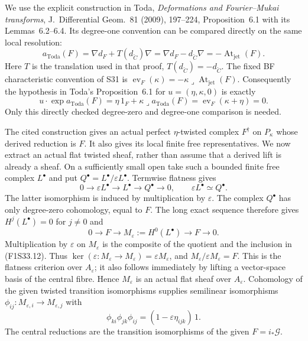 We use the explicit construction in Toda,
\emph{Deformations and Fourier--Mukai transforms},
J.~Differential Geom.~81 (2009), 197--224,
Proposition~6.1 with its Lemmas~6.2--6.4.
Its degree-one convention can be compared directly
on the same local resolution:
\[
 a_{\mathrm{Toda}}(F)=
       \nabla d_F+T(d_{\check C})\nabla
       =\nabla d_F-d_{\check C}\nabla
       =-\operatorname{At}_{\mathrm{jet}}(F).
 \tag{F1S33.9}
\]
Here $T$ is the translation used in that proof,
$T(d_{\check C})=-d_{\check C}$.
The fixed BF characteristic convention of S31 is
$\operatorname{ev}_F(\kappa)
 =-\kappa\mathbin{\lrcorner}\operatorname{At}_{\mathrm{jet}}(F)$.
Consequently the hypothesis in Toda's Proposition~6.1
for $u=(\eta,\kappa,0)$ is exactly
\[
 u\cdot\exp a_{\mathrm{Toda}}(F)
     =\eta\,1_F+\kappa\mathbin{\lrcorner}a_{\mathrm{Toda}}(F)
     =\operatorname{ev}_F(\kappa+\eta)=0.
 \tag{F1S33.10}
\]
Only this directly checked degree-zero and degree-one
comparison is needed.

The cited construction gives an actual perfect
$\eta$-twisted complex $F^\dagger$ on $P_\kappa$
whose derived reduction is $F$.
It also gives its local finite free representatives.
We now extract an actual flat twisted sheaf,
rather than assume that a derived lift is already
a sheaf.
On a sufficiently small open take such a bounded
finite free complex $L^\bullet$ and put
$Q^\bullet=L^\bullet/\varepsilon L^\bullet$.
Termwise flatness gives
\[
 0\longrightarrow\varepsilon L^\bullet
    \longrightarrow L^\bullet\longrightarrow Q^\bullet
    \longrightarrow0,\qquad
 \varepsilon L^\bullet\simeq Q^\bullet.
 \tag{F1S33.11}
\]
The latter isomorphism is induced by multiplication
by $\varepsilon$. The complex $Q^\bullet$ has only
degree-zero cohomology, equal to $F$.
The long exact sequence therefore gives
$H^j(L^\bullet)=0$ for $j\ne0$ and
\[
 0\longrightarrow F
   \longrightarrow M_\varepsilon:=H^0(L^\bullet)
   \longrightarrow F\longrightarrow0.
 \tag{F1S33.12}
\]
Multiplication by $\varepsilon$ on $M_\varepsilon$
is the composite of the quotient and the inclusion
in (F1S33.12). Thus
$\ker(\varepsilon:M_\varepsilon\to M_\varepsilon)
 =\varepsilon M_\varepsilon$, and
$M_\varepsilon/\varepsilon M_\varepsilon=F$.
This is the flatness criterion over $A_\varepsilon$;
it also follows immediately by lifting a vector-space
basis of the central fibre. Hence $M_\varepsilon$
is an actual flat sheaf over $A_\varepsilon$.
Cohomology of the given twisted transition
isomorphisms supplies semilinear isomorphisms
$\phi_{ij}:M_{\varepsilon,i}\to M_{\varepsilon,j}$
with
\[
 \phi_{ki}\phi_{jk}\phi_{ij}
            =(1-\varepsilon\eta_{ijk})\,1.
 \tag{F1S33.13}
\]
The central reductions are the transition
isomorphisms of the given $F=i_*\mathcal G$.

